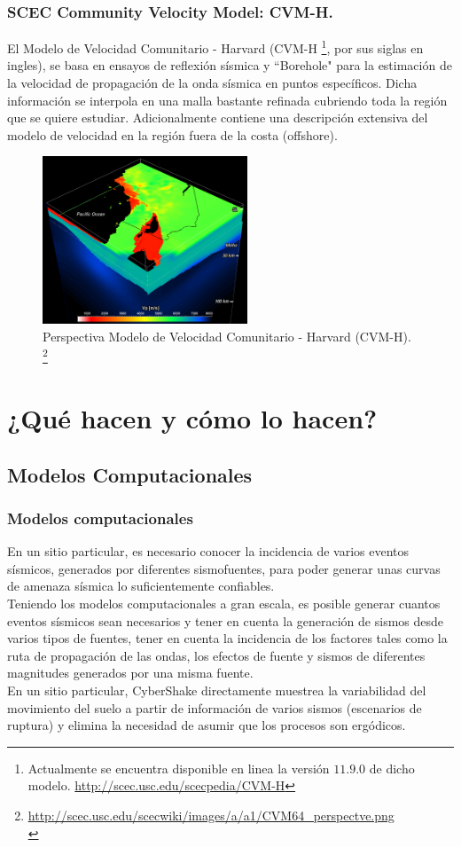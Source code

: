 \documentclass{beamer}
\begin{document}
%
%
\begin{frame}[allowframebreaks]
\frametitle{SCEC Community Velocity Model: CVM-H.}
%
\justifying
%
El Modelo de Velocidad Comunitario - Harvard (CVM-H \footnote{\tiny Actualmente se encuentra disponible en linea la versión $11.9.0$ de dicho modelo. \url{http://scec.usc.edu/scecpedia/CVM-H}}, por sus siglas en ingles), se basa en ensayos de reflexión sísmica y ``Borehole" para la estimación de la velocidad de propagación de la onda sísmica en puntos específicos. Dicha información se interpola en una malla bastante refinada cubriendo toda la región que se quiere estudiar. Adicionalmente contiene una descripción extensiva del modelo de velocidad en la región fuera de la costa (offshore).
%
\begin{figure}[h]
	\centering
	\includegraphics[height=5cm]{img/CVM64_perspectve.pdf}
	\caption{Perspectiva Modelo de Velocidad Comunitario - Harvard (CVM-H). \footnote{\tiny\url{http://scec.usc.edu/scecwiki/images/a/a1/CVM64_perspectve.png}\\}}
\end{figure}
%
%
\end{frame}
%
%
\section{¿Qué hacen y cómo lo hacen?}
\subsection{Modelos Computacionales}
\begin{frame}%
\frametitle{Modelos computacionales}
%
\justifying
%
En un sitio particular, es necesario conocer la incidencia de varios eventos sísmicos, generados por diferentes sismofuentes, para poder generar unas curvas de amenaza sísmica lo suficientemente confiables.\\
%
Teniendo los modelos computacionales a gran escala, es posible generar cuantos eventos sísmicos sean necesarios y tener en cuenta la generación de sismos desde varios tipos de fuentes, tener en cuenta la incidencia de los factores tales como la ruta de propagación de las ondas, los efectos de fuente y sismos de diferentes magnitudes generados por una misma fuente.\\
%
En un sitio particular, CyberShake directamente muestrea la variabilidad del movimiento del suelo a partir de información de varios sismos (escenarios de ruptura) y elimina la necesidad de asumir que los procesos son ergódicos.\\
%
\end{frame}
%
%
\end{document}
